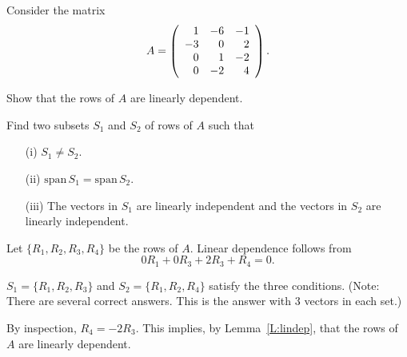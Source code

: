 \documentclass{ximera}
\author{Matthew Carr \& Marty Golubitsky}
\begin{document}
\begin{exercise}\label{mc.exerciseErr6_M}
Consider the matrix
 \[
A=\left(\begin{array}{rrrrrrrrrrrrrrrrrr} 1 & -6 & -1 \\ -3 & 0 & 2 \\ 0 & 1 & -2 \\ 0 & -2 & 4 \end{array}\right)\ldotp
\]
\begin{enumeratea} 
\item Show that the rows of $A$ are  linearly dependent.
\item Find two subsets $S_1$ and $S_2$ of rows of $A$ such that 
\begin{enumerate}
	\item[(i)] $S_1\ne S_2$.
	\item[(ii)] $\mathrm{span}\,S_1=\mathrm{span}\,S_2$. 
	\item[(iii)] The vectors in $S_1$ are linearly independent and the vectors in $S_2$ are linearly independent. 
	\end{enumerate}
\end{enumeratea}

\begin{solution}
\ans 
\begin{enumeratea}
\item Let $\{R_1,R_2,R_3,R_4\}$ be the rows of $A$.  Linear dependence follows from 
\[
0R_1 + 0R_3+2R_3+R_4 = 0.
\] 
\item $S_1=\{R_1,R_2,R_3\}$ and $S_2=\{R_1,R_2,R_4\}$ satisfy the three conditions.  (Note: There are several correct answers.  This is the answer with 3 vectors in each set.)
\end{enumeratea}

\soln 

\begin{enumeratea}

\item By inspection, $R_4=-2R_3$. This implies, by Lemma~\ref{L:lindep}, that the rows of $A$ are linearly dependent. 


\end{enumeratea}
\end{solution}
\end{exercise}
\end{document}
